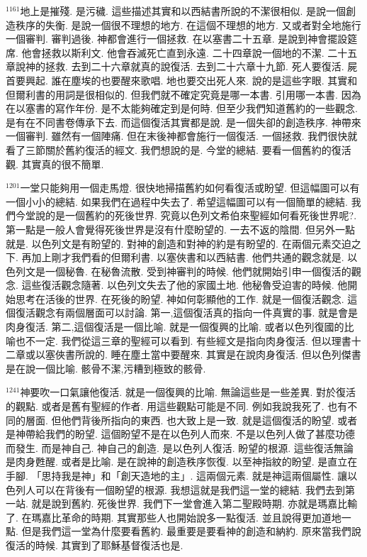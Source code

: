 \documentclass{book}
\begin{document}
$^{1161}$地上是摧殘.
是污穢.
這些描述其實和以西結書所說的不潔很相似.
是說一個創造秩序的失衡.
是說一個很不理想的地方.
在這個不理想的地方.
又或者對全地施行一個審判.
審判過後.
神都會進行一個拯救.
在以塞書二十五章.
是說到神會擺設筵席.
他會拯救以斯利文.
他會吞滅死亡直到永遠.
二十四章說一個地的不潔.
二十五章說神的拯救.
去到二十六章就真的說復活.
去到二十六章十九節.
死人要復活.
屍首要興起.
誰在塵埃的也要醒來歌唱.
地也要交出死人來.
說的是這些字眼.
其實和但爾利書的用詞是很相似的.
但我們就不確定究竟是哪一本書.
引用哪一本書.
因為在以塞書的寫作年份.
是不太能夠確定到是何時.
但至少我們知道舊約的一些觀念.
是有在不同書卷傳承下去.
而這個復活其實都是說.
是一個失卻的創造秩序.
神帶來一個審判.
雖然有一個陣痛.
但在末後神都會施行一個復活.
一個拯救.
我們很快就看了三節關於舊約復活的經文.
我們想說的是.
今堂的總結.
要看一個舊約的復活觀.
其實真的很不簡單.

$^{1201}$一堂只能夠用一個走馬燈.
很快地掃描舊約如何看復活或盼望.
但這幅圖可以有一個小小的總結.
如果我們在過程中失去了.
希望這幅圖可以有一個簡單的總結.
我們今堂說的是一個舊約的死後世界.
究竟以色列文希伯來聖經如何看死後世界呢?.
第一點是一般人會覺得死後世界是沒有什麼盼望的.
一去不返的陰間.
但另外一點就是.
以色列文是有盼望的.
對神的創造和對神的約是有盼望的.
在兩個元素交迫之下.
再加上剛才我們看的但爾利書.
以塞俠書和以西結書.
他們共通的觀念就是.
以色列文是一個秘魯.
在秘魯流散.
受到神審判的時候.
他們就開始引申一個復活的觀念.
這些復活觀念隨著.
以色列文失去了他的家國土地.
他秘魯受迫害的時候.
他開始思考在活後的世界.
在死後的盼望.
神如何彰顯他的工作.
就是一個復活觀念.
這個復活觀念有兩個層面可以討論.
第一,這個復活真的指向一件真實的事.
就是會是肉身復活.
第二,這個復活是一個比喻.
就是一個復興的比喻.
或者以色列復國的比喻也不一定.
我們從這三章的聖經可以看到.
有些經文是指向肉身復活.
但以理書十二章或以塞俠書所說的.
睡在塵土當中要醒來.
其實是在說肉身復活.
但以色列傑書是在說一個比喻.
骸骨不潔,污糟到極致的骸骨.

$^{1241}$神要吹一口氣讓他復活.
就是一個復興的比喻.
無論這些是一些差異.
對於復活的觀點.
或者是舊有聖經的作者.
用這些觀點可能是不同.
例如我說我死了.
也有不同的層面.
但他們背後所指向的東西.
也大致上是一致.
就是這個復活的盼望.
或者是神帶給我們的盼望.
這個盼望不是在以色列人而來.
不是以色列人做了甚麼功德而發生.
而是神自己.
神自己的創造.
是以色列人復活.
盼望的根源.
這些復活無論是肉身甦醒.
或者是比喻.
是在說神的創造秩序恢復.
以至神指紋的盼望.
是直立在手腳.
「思持我是神」和「創天造地的主」.
這兩個元素.
就是神這兩個屬性.
讓以色列人可以在背後有一個盼望的根源.
我想這就是我們這一堂的總結.
我們去到第一站.
就是說到舊約.
死後世界.
我們下一堂會進入第二聖殿時期.
亦就是瑪嘉比輸了.
在瑪嘉比革命的時期.
其實那些人也開始說多一點復活.
並且說得更加道地一點.
但是我們這一堂為什麼要看舊約.
最重要是要看神的創造和納約.
原來當我們說復活的時候.
其實到了耶穌基督復活也是.
\end{document}
